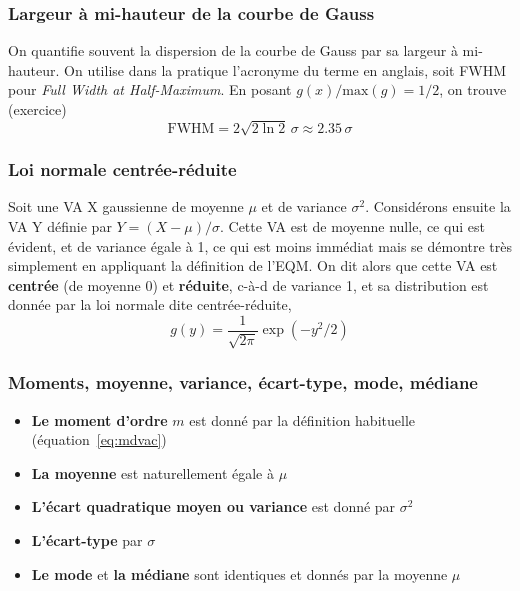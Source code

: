 \subsubsection{Largeur à mi-hauteur de la courbe de Gauss}

On quantifie souvent la dispersion de la courbe de Gauss par sa largeur à mi-hauteur. On utilise dans la pratique l'acronyme du terme en anglais, soit FWHM pour {\it Full Width at Half-Maximum}. En posant $g(x)/\text{max}(g)=1/2$, on trouve (exercice)
\begin{equation}
\text{FWHM}=2\sqrt{2\ln{2}}\,\sigma\approx2.35\,\sigma
\label{eq:fwhm}
\end{equation}

\subsubsection{Loi normale centrée-réduite}

Soit une VA X gaussienne de moyenne $\mu$ et de variance $\sigma^2$. Considérons ensuite la VA Y définie par $Y=(X-\mu)/\sigma$. Cette VA est de moyenne nulle, ce qui est évident, et de variance égale à 1, ce qui est moins immédiat mais se démontre très simplement en appliquant la définition de l'EQM. On dit alors que cette VA est \textbf{centrée} (de moyenne 0) et \textbf{réduite}, c-à-d de variance 1, et sa distribution est donnée par la loi normale dite centrée-réduite,
\begin{equation}
g(y)=\frac{1}{\sqrt{2\pi}}\exp{(-y^2/2)}
\end{equation}

\subsubsection{Moments, moyenne, variance, écart-type, mode, médiane}

\begin{itemize}\itemsep1pt
\renewcommand{\labelitemi}{$\bullet$}
\item \textbf{Le moment d'ordre} $m$ est donné par la définition habituelle (équation~\ref{eq:mdvac})
\item \textbf{La moyenne} est naturellement égale à $\mu$
\item \textbf{L'écart quadratique moyen ou variance} est donné par $\sigma^2$
\item \textbf{L'écart-type} par $\sigma$
\item \textbf{Le mode} et \textbf{la médiane} sont identiques et donnés par la moyenne $\mu$
\end{itemize}

